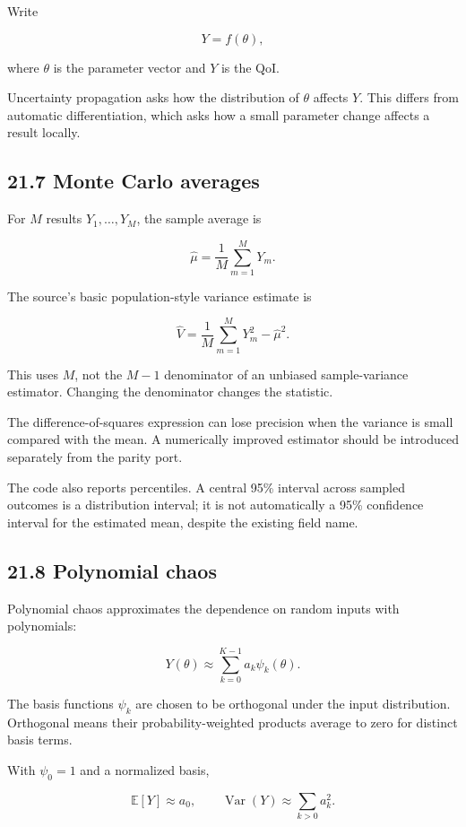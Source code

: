 \documentclass[11pt,a4paper]{article}
\begin{document}
Write


\begingroup\small
\[
Y=f(\theta),
\]
\endgroup


where \(\theta\) is the parameter vector and \(Y\) is the QoI.

Uncertainty propagation asks how the distribution of \(\theta\) affects \(Y\). This differs from automatic differentiation, which asks how a small parameter change affects a result locally.

\subsection{21.7 Monte Carlo averages}
For \(M\) results \(Y_1,\ldots,Y_M\), the sample average is


\begingroup\small
\[
\widehat\mu=\frac1M\sum_{m=1}^{M}Y_m.
\]
\endgroup


The source's basic population-style variance estimate is


\begingroup\small
\[
\widehat V
=\frac1M\sum_{m=1}^{M}Y_m^2-\widehat\mu^2.
\]
\endgroup


This uses \(M\), not the \(M-1\) denominator of an unbiased sample-variance estimator. Changing the denominator changes the statistic.

The difference-of-squares expression can lose precision when the variance is small compared with the mean. A numerically improved estimator should be introduced separately from the parity port.

The code also reports percentiles. A central 95\% interval across sampled outcomes is a distribution interval; it is not automatically a 95\% confidence interval for the estimated mean, despite the existing field name.

\subsection{21.8 Polynomial chaos}
Polynomial chaos approximates the dependence on random inputs with polynomials:


\begingroup\small
\[
Y(\theta)\approx\sum_{k=0}^{K-1}a_k\psi_k(\theta).
\]
\endgroup


The basis functions \(\psi_k\) are chosen to be orthogonal under the input distribution. Orthogonal means their probability-weighted products average to zero for distinct basis terms.

With \(\psi_0=1\) and a normalized basis,


\begingroup\small
\[
\mathbb E[Y]\approx a_0,
\qquad
\operatorname{Var}(Y)\approx\sum_{k>0}a_k^2.
\]
\endgroup
\end{document}
